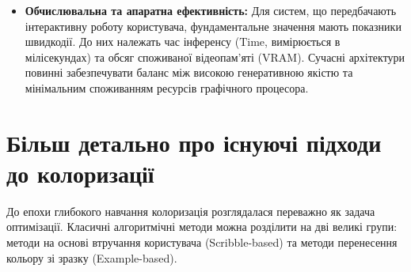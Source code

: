 \begin{itemize}[label=$\bullet$]
            \item \textbf{Обчислювальна та апаратна ефективність:} Для систем, що передбачають інтерактивну роботу користувача, фундаментальне значення мають показники швидкодії.
            До них належать час інференсу ($\mathrm{Time}$, вимірюється в мілісекундах) та обсяг споживаної відеопам'яті ($\mathrm{VRAM}$).
            Сучасні архітектури повинні забезпечувати баланс між високою генеративною якістю та мінімальним споживанням ресурсів графічного процесора.
        \end{itemize}







    \section{Більш детально про існуючі підходи до колоризації}

        До епохи глибокого навчання колоризація розглядалася переважно як задача оптимізації.
        Класичні алгоритмічні методи можна розділити на дві великі групи: методи на основі втручання користувача (Scribble-based) та методи перенесення кольору зі зразку (Example-based).

